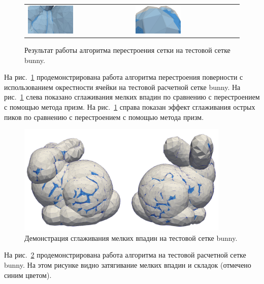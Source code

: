 \begin{figure}[ht]
\centering
\begin{tabular}{ll}
\includegraphics[width=0.45\textwidth]{./pics/text_1_remesh_common_envelope/pic_envelope_cave.png}
&
\includegraphics[width=0.45\textwidth]{./pics/text_1_remesh_common_envelope/pic_envelope_peak.png}
\end{tabular}
\singlespacing
{}\caption{Результат работы алгоритма перестроения сетки на тестовой сетке bunny.}
\label{fig:text_1_remesh3_common_envelope_bunny}
\end{figure}

На рис.~\ref{fig:text_1_remesh3_common_envelope_bunny} продемонстрирована работа алгоритма перестроения поверности с использованием окрестности ячейки на тестовой расчетной сетке bunny.
На рис.~\ref{fig:text_1_remesh3_common_envelope_bunny} слева показано сглаживания мелких впадин по сравнению с перестроением с помощью метода призм.
На рис.~\ref{fig:text_1_remesh3_common_envelope_bunny} справа показан эффект сглаживания острых пиков по сравнению с перестроением с помощью метода призм.

\begin{figure}[ht]
\centering
\includegraphics[width=0.9\textwidth]{./pics/text_1_remesh_common_envelope/bunny.png}
\singlespacing
{}\caption{Демонстрация сглаживания мелких впадин на тестовой сетке bunny.}
\label{fig:text_1_remesh3_common_envelope_bunny2}
\end{figure}

На рис.~\ref{fig:text_1_remesh3_common_envelope_bunny2} продемонстрирована работа алгоритма на тестовой расчетной сетке bunny.
На этом рисунке видно затягивание мелких впадин и складок (отмечено синим цветом).
